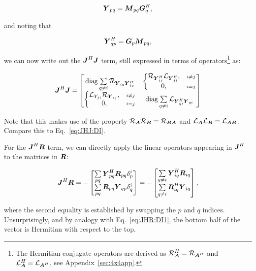 \documentclass[useAMS,usenatbib]{mn2e}
\newcommand{\mat}[1]{{\bmath{#1}}}
\newcommand{\JJ}{\mat{J}} %
\newcommand{\MM}{\mat{M}}
\newcommand{\RR}{\mat{R}}
\newcommand{\GG}{\mat{G}}
\newcommand{\JHJ}{\JJ^H\JJ} %
\begin{document}
\newcommand{\YY}{\mat{Y}}
\newcommand{\ZZ}{\mat{Z}}
\[
\YY_{pq} = \MM_{pq} \GG^H_q,
\]

and noting that 

\[
\YY_{qp}^H = \GG_p \MM_{pq},
\]

we can now write out the $\JHJ$ term, still expressed in terms of operators\footnote{The Hermitian
conjugate operators are derived as $\Rop{\mat{A}}^H=\Rop{\mat{A}^H}$ and $\Lop{\mat{A}}^H=\Lop{\mat{A}^H}$,
see Appendix~\ref{sec:4x4app}.} as:

\begin{equation}
\label{eq:JHJ:pol}
\JHJ = \Matrix{cc}{
  \mathrm{diag}\sum\limits_{q\ne i} \Rop{\YY_{iq} \YY^H_{iq}} & 
  \left \{ 
  \begin{array}{@{}cc@{}}
   \Rop{ \YY^H_{ij}  } \Lop{\YY^H_{ji}},&{\scriptstyle i\ne j} \\
   0, &{\scriptstyle i=j}
  \end{array} \right . 
  \\
  \left \{ 
  \begin{array}{@{}cc@{}}
   \Lop{ Y_{ji}  } \Rop{\YY_{ij}},&{\scriptstyle i\ne j} \\
   0, &{\scriptstyle i=j}
  \end{array} \right . 
  &
  \mathrm{diag}\sum\limits_{q\ne i} \Lop{\YY^H_{qi}\YY_{qi}}
}
\end{equation}

Note that this makes use of the property $\Rop{\mat{A}}\Rop{\mat{B}}=\Rop{\mat{BA}}$ and 
$\Lop{\mat{A}}\Lop{\mat{B}}=\Lop{\mat{AB}}$. 
Compare this to Eq.~\ref{eq:JHJ:DI}.

For the $\JJ^H\bmath{R}$ term, we can directly apply the linear operators appearing in $\JJ^H$ 
to the matrices in $\bmath{R}$:

\begin{equation}
\JJ^H\bmath{R} = -\Matrix{c}{ 
\sum\limits_{pq} \YY^H_{pq} \RR_{pq} \delta^{i}_p  \\
\sum\limits_{pq} \RR_{pq} \YY_{qp} \delta^{i}_q 
} = -\Matrix{c}{
\sum\limits_{q\ne i} \YY^H_{iq} \RR_{iq} \\
\sum\limits_{q\ne i} \RR^H_{iq} \YY_{iq}  
},
\end{equation}

where the second equality is established by swapping the $p$ and $q$ indices. Unsurprisingly, and by analogy with 
Eq.~\ref{eq:JHR:DI1}, the bottom half of the vector is Hermitian with respect to the top.
\end{document}
